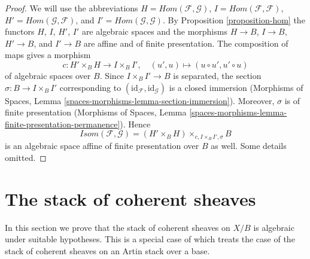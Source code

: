 \documentclass{stacks-project}
\theoremstyle{plain}
\theoremstyle{definition}
\theoremstyle{remark}
\numberwithin{equation}{subsection}
\begin{document}
\begin{proof}
We will use the abbreviations
$H = \mathit{Hom}(\mathcal{F}, \mathcal{G})$,
$I = \mathit{Hom}(\mathcal{F}, \mathcal{F})$,
$H' = \mathit{Hom}(\mathcal{G}, \mathcal{F})$, and
$I' = \mathit{Hom}(\mathcal{G}, \mathcal{G})$.
By Proposition \ref{proposition-hom} the functors
$H$, $I$, $H'$, $I'$ are algebraic spaces and the morphisms
$H \to B$, $I \to B$, $H' \to B$, and $I' \to B$
are affine and of finite presentation.
The composition of maps gives a morphism
$$
c : H' \times_B H \longrightarrow I \times_B I',\quad
(u', u) \longmapsto (u \circ u', u' \circ u)
$$
of algebraic spaces over $B$. Since $I \times_B I' \to B$ is separated,
the section $\sigma : B \to I \times_B I'$ corresponding to
$(\text{id}_\mathcal{F}, \text{id}_\mathcal{G})$
is a closed immersion
(Morphisms of Spaces, Lemma \ref{spaces-morphisms-lemma-section-immersion}).
Moreover, $\sigma$ is of finite presentation
(Morphisms of Spaces, Lemma
\ref{spaces-morphisms-lemma-finite-presentation-permanence}).
Hence
$$
\mathit{Isom}(\mathcal{F}, \mathcal{G}) =
(H' \times_B H) \times_{c, I \times_B I', \sigma} B
$$
is an algebraic space affine of finite presentation over $B$ as well.
Some details omitted.
\end{proof}






\section{The stack of coherent sheaves}
\label{section-stack-coherent-sheaves}

\noindent
In this section we prove that the stack of coherent sheaves 
on $X/B$ is algebraic under suitable hypotheses. This is a
special case of \cite[Theorem 2.1.1]{lieblich_remarks}
which treats the case of the stack of coherent sheaves on an
Artin stack over a base.
\end{document}
